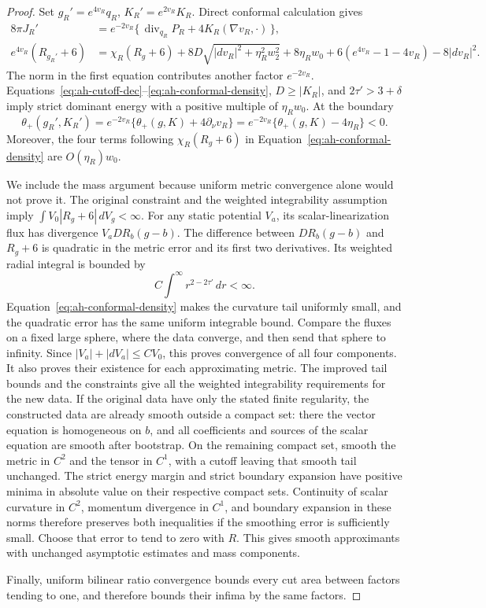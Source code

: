 \begin{proof}
Set \(g_R'=e^{4v_R}q_R\), \(K_R'=e^{2v_R}K_R\).  Direct conformal
calculation gives
\begin{align}
 8\pi J_R'&=e^{-2v_R}
  \{\,\operatorname{div}_{q_R}P_R+4K_R(\nabla v_R,\cdot)\,\},
       \label{eq:ah-conformal-momentum}\\
 e^{4v_R}(R_{g_R'}+6)&=\chi_R(R_g+6)
  +8D\sqrt{|dv_R|^2+\eta_R^2w_2^2}+8\eta_Rw_0
  +6(e^{4v_R}-1-4v_R)-8|dv_R|^2 .
       \label{eq:ah-conformal-density}
\end{align}
The norm in the first equation contributes another factor \(e^{-2v_R}\).
Equations~\eqref{eq:ah-cutoff-dec}--\eqref{eq:ah-conformal-density},
\(D\ge|K_R|\), and \(2\tau'>3+\delta\) imply strict dominant energy
with a positive multiple of \(\eta_Rw_0\).  At the boundary
\[
 \theta_+(g_R',K_R')
 =e^{-2v_R}\{\theta_+(g,K)+4\partial_\nu v_R\}
 =e^{-2v_R}\{\theta_+(g,K)-4\eta_R\}<0 .
\]
Moreover, the four terms following \(\chi_R(R_g+6)\) in
Equation~\eqref{eq:ah-conformal-density} are \(O(\eta_R)w_0\).

We include the mass argument because uniform metric convergence alone
would not prove it.  The original constraint and the weighted
integrability assumption imply
\(\int V_0|R_g+6|\,dV_g<\infty\).
For any static potential \(V_a\), its scalar-linearization flux
has divergence \(V_aDR_b(g-b)\).  The difference between
\(DR_b(g-b)\) and \(R_g+6\) is quadratic in the metric error and its
first two derivatives.  Its weighted radial integral is bounded by
\[
 C\int^\infty r^{2-2\tau'}\,dr<\infty .
\]
Equation~\eqref{eq:ah-conformal-density} makes the curvature tail
uniformly small, and the quadratic error has the same uniform
integrable bound.  Compare the fluxes on a fixed large sphere,
where the data converge, and then send that sphere to infinity.
Since \(|V_a|+|dV_a|\le C V_0\), this proves convergence of all
four components.  It also proves their existence for each
approximating metric.  The improved tail bounds and the constraints
give all the weighted integrability requirements for the new data.
If the original data have only the stated finite regularity, the
constructed data are already smooth outside a compact set: there
the vector equation is homogeneous on \(b\), and all coefficients
and sources of the scalar equation are smooth after bootstrap.
On the remaining compact set, smooth the metric in \(C^2\) and the
tensor in \(C^1\), with a cutoff leaving that smooth tail unchanged.
The strict energy margin and strict boundary expansion have positive
minima in absolute value on their respective compact sets. Continuity
of scalar curvature in \(C^2\), momentum divergence in \(C^1\), and
boundary expansion in these norms therefore preserves both
inequalities if the smoothing error is sufficiently small.
Choose that error to tend to zero with \(R\). This gives smooth
approximants with unchanged asymptotic estimates and mass components.

Finally, uniform bilinear ratio convergence bounds every cut area
between factors tending to one, and therefore bounds their infima
by the same factors.
\end{proof}

